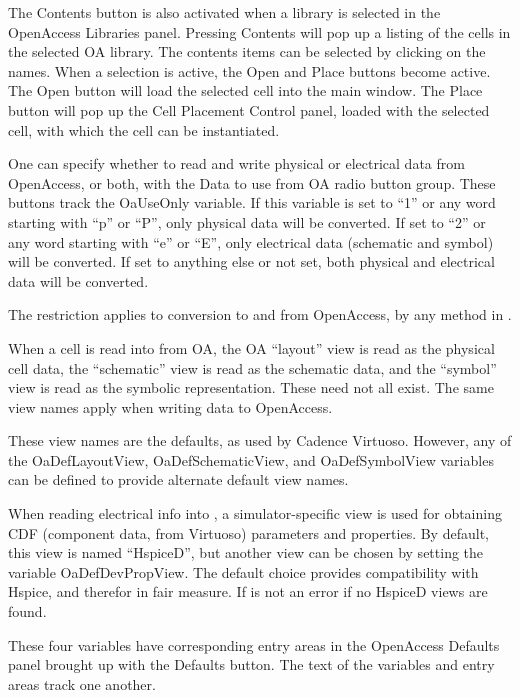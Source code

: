 The {\cb Contents} button is also activated when a library is selected
in the {\cb OpenAccess Libraries} panel.  Pressing {\cb Contents} will
pop up a listing of the cells in the selected OA library.  The
contents items can be selected by clicking on the names.  When a
selection is active, the {\cb Open} and {\cb Place} buttons become
active.  The {\cb Open} button will load the selected cell into the
main window.  The {\cb Place} button will pop up the {\cb Cell
Placement Control} panel, loaded with the selected cell, with which
the cell can be instantiated.

One can specify whether to read and write physical or electrical data
from OpenAccess, or both, with the {\cb Data to use from OA} radio
button group.  These buttons track the {\et OaUseOnly} variable.  If
this variable is set to ``1'' or any word starting with ``p'' or
``P'', only physical data will be converted.  If set to ``2'' or any
word starting with ``e'' or ``E'', only electrical data (schematic and
symbol) will be converted.  If set to anything else or not set, both
physical and electrical data will be converted.

The restriction applies to conversion to and from OpenAccess, by any
method in {\Xic}.

When a cell is read into {\Xic} from OA, the OA ``layout'' view is
read as the physical cell data, the ``schematic'' view is read as the
schematic data, and the ``symbol'' view is read as the symbolic
representation.  These need not all exist.  The same view names apply
when writing data to OpenAccess.

These view names are the defaults, as used by Cadence Virtuoso. 
However, any of the {\et OaDefLayoutView}, {\et OaDefSchematicView},
and {\et OaDefSymbolView} variables can be defined to provide
alternate default view names.

When reading electrical info into {\Xic}, a simulator-specific view is
used for obtaining CDF (component data, from Virtuoso) parameters and
properties.  By default, this view is named ``{\vt HspiceD}'', but
another view can be chosen by setting the variable {\et
OaDefDevPropView}.  The default choice provides compatibility with
Hspice, and therefor {\WRspice} in fair measure.  If is not an error
if no {\vt HspiceD} views are found.

These four variables have corresponding entry areas in the {\cb
OpenAccess Defaults} panel brought up with the {\cb Defaults} button. 
The text of the variables and entry areas track one another.

